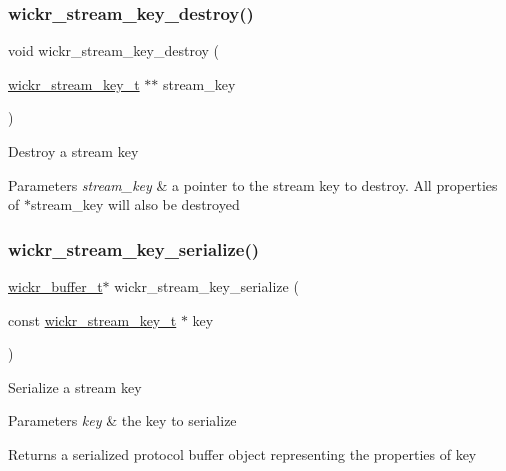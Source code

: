 \subsubsection{\texorpdfstring{wickr\+\_\+stream\+\_\+key\+\_\+destroy()}{wickr\_stream\_key\_destroy()}}
{\footnotesize\ttfamily void wickr\+\_\+stream\+\_\+key\+\_\+destroy (\begin{DoxyParamCaption}\item[{\mbox{\hyperlink{structwickr__stream__key}{wickr\+\_\+stream\+\_\+key\+\_\+t}} $\ast$$\ast$}]{stream\+\_\+key }\end{DoxyParamCaption})}

Destroy a stream key


\begin{DoxyParams}{Parameters}
{\em stream\+\_\+key} & a pointer to the stream key to destroy. All properties of \textquotesingle{}$\ast$stream\+\_\+key\textquotesingle{} will also be destroyed \\
\hline
\end{DoxyParams}
\mbox{\label{group__wickr__stream__key_gae1540c98a88e2f62e96fb2ee209e2290}} 
\subsubsection{\texorpdfstring{wickr\+\_\+stream\+\_\+key\+\_\+serialize()}{wickr\_stream\_key\_serialize()}}
{\footnotesize\ttfamily \mbox{\hyperlink{structwickr__buffer}{wickr\+\_\+buffer\+\_\+t}}$\ast$ wickr\+\_\+stream\+\_\+key\+\_\+serialize (\begin{DoxyParamCaption}\item[{const \mbox{\hyperlink{structwickr__stream__key}{wickr\+\_\+stream\+\_\+key\+\_\+t}} $\ast$}]{key }\end{DoxyParamCaption})}

Serialize a stream key


\begin{DoxyParams}{Parameters}
{\em key} & the key to serialize \\
\hline
\end{DoxyParams}
\begin{DoxyReturn}{Returns}
a serialized protocol buffer object representing the properties of \textquotesingle{}key\textquotesingle{} 
\end{DoxyReturn}
